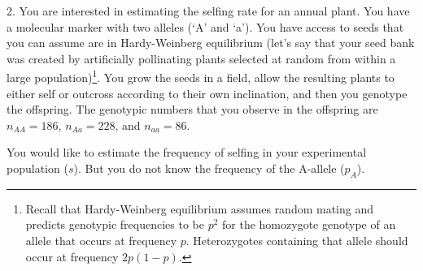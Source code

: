 \documentclass[11pt]{article}
\newcommand{\answer}[1]{}
\begin{document}
\answer{
\begin{eqnarray*}
	L(\lambda) & = & \Pr(X|\lambda) \\
		& = & \prod_{i=1}^{n}\frac{e^{-\lambda}\lambda^{x_i}}{x_i!} \\
	\ln L(\lambda) & = & \sum_{i=1}^{n}\ln\left(\frac{e^{-\lambda}\lambda^{x_i}}{x_i!}\right) \\
	& = & \sum_{i=1}^{n}\left[\ln \left(e^{-\lambda}\right) + \ln \left(\lambda^{x_i}\right) - \ln \left(x_i!\right)\right] \\
	& = & \sum_{i=1}^{n}\left[-\lambda + {x_i}\ln \left(\lambda\right) - \ln \left(x_i!\right)\right] \\
	\frac{d \ln L(\lambda)}{d \lambda} & = & \sum_{i=1}^{n}\left[-1 + \frac{x_i}{\lambda}\right] \\
	& = & -n + \frac{\sum_{i=1}^{n}x_i}{\lambda} \\
	-n + \frac{\sum_{i=1}^{n}x_i}{\hat\lambda} & = & 0 \\
	\hat\lambda & = & \frac{\sum_{i=1}^{n}x_i}{n} = \bar x = 2.6 \\
	\ln L(\lambda = 2 ) & = & -40.27\\
	\ln L(\lambda = 2.6 ) & = & -38.63 \\
	2 \left[\ln L(\lambda = 2 ) - \ln L(\lambda = 2.6 )\right] & = &  -3.29
\end{eqnarray*}

This is not significant.  So we cannot reject the null that $\lambda = 2$.
}
\newpage


2. You are interested in estimating the selfing rate for an annual plant.  You have a molecular marker with two alleles (`A' and `a'). You have access to seeds that you can assume are in Hardy-Weinberg equilibrium (let's say that your seed bank was created by artificially pollinating plants selected at random from within a large population)\footnote{Recall that Hardy-Weinberg equilibrium assumes random mating and predicts genotypic frequencies to be $p^2$ for the homozygote genotype of an allele that occurs at frequency $p$. Heterozygotes containing that allele should occur at frequency $2p(1-p)$.}.  You grow the seeds in a field, allow the resulting plants to either self or outcross according to their own inclination, and then you genotype the offspring.
The genotypic numbers that you observe in the offspring are $n_{AA} = 186$, $n_{Aa} = 228$, and $n_{aa} = 86$.

You would like to estimate the frequency of selfing in your experimental population ($s$).  But you do not know the frequency of the A-allele ($p_A$).
\end{document}
